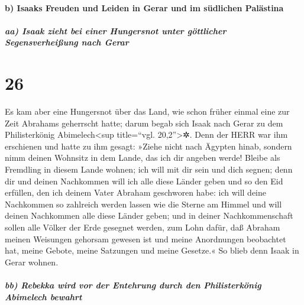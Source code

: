 \hypertarget{b-isaaks-freuden-und-leiden-in-gerar-und-im-suxfcdlichen-paluxe4stina}{%
\paragraph{b) Isaaks Freuden und Leiden in Gerar und im südlichen
Palästina}\label{b-isaaks-freuden-und-leiden-in-gerar-und-im-suxfcdlichen-paluxe4stina}}

\hypertarget{aa-isaak-zieht-bei-einer-hungersnot-unter-guxf6ttlicher-segensverheiuxdfung-nach-gerar}{%
\subparagraph{aa) Isaak zieht bei einer Hungersnot unter göttlicher
Segensverheißung nach
Gerar}\label{aa-isaak-zieht-bei-einer-hungersnot-unter-guxf6ttlicher-segensverheiuxdfung-nach-gerar}}

\hypertarget{section-25}{%
\section{26}\label{section-25}}

 Es kam aber eine Hungersnot über das Land, wie schon
früher einmal eine zur Zeit Abrahams geherrscht hatte; darum begab sich
Isaak nach Gerar zu dem Philisterkönig Abimelech\textless sup
title=``vgl. 20,2''\textgreater✲.  Denn der HERR war ihm
erschienen und hatte zu ihm gesagt: »Ziehe nicht nach Ägypten hinab,
sondern nimm deinen Wohnsitz in dem Lande, das ich dir angeben werde!
 Bleibe als Fremdling in diesem Lande wohnen; ich will mit
dir sein und dich segnen; denn dir und deinen Nachkommen will ich alle
diese Länder geben und so den Eid erfüllen, den ich deinem Vater Abraham
geschworen habe:  ich will deine Nachkommen so zahlreich
werden lassen wie die Sterne am Himmel und will deinen Nachkommen alle
diese Länder geben; und in deiner Nachkommenschaft sollen alle Völker
der Erde gesegnet werden,  zum Lohn dafür, daß Abraham
meinen Weisungen gehorsam gewesen ist und meine Anordnungen beobachtet
hat, meine Gebote, meine Satzungen und meine Gesetze.«  So
blieb denn Isaak in Gerar wohnen.

\hypertarget{bb-rebekka-wird-vor-der-entehrung-durch-den-philisterkuxf6nig-abimelech-bewahrt}{%
\subparagraph{bb) Rebekka wird vor der Entehrung durch den
Philisterkönig Abimelech
bewahrt}\label{bb-rebekka-wird-vor-der-entehrung-durch-den-philisterkuxf6nig-abimelech-bewahrt}}

